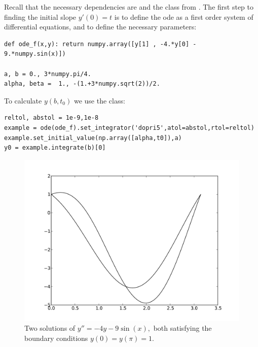 
Recall that the necessary dependencies are  and the  class from \newline {}. The first step to finding the initial slope $y'(0) = t$ is to define 
the ode as a first order system of differential equations, and to define the necessary parameters:
\begin{lstlisting}
def ode_f(x,y): return numpy.array([y[1] , -4.*y[0] - 9.*numpy.sin(x)])

a, b = 0., 3*numpy.pi/4.
alpha, beta =  1., -(1.+3*numpy.sqrt(2))/2.

\end{lstlisting}
To calculate $y(b,t_0)$ we use the  class: 
\begin{lstlisting}
reltol, abstol = 1e-9,1e-8
example = ode(ode_f).set_integrator('dopri5',atol=abstol,rtol=reltol) 
example.set_initial_value(np.array([alpha,t0]),a) 
y0 = example.integrate(b)[0]
\end{lstlisting}


\begin{figure}[ht]
\centering
\includegraphics[width=\textwidth]{Fig1.pdf}
\caption{Two solutions of $y'' = -4y -9\sin(x),$ both satisfying the boundary conditions $y(0) = y(\pi) = 1.$}
\label{shooting:prob2}
\end{figure}




